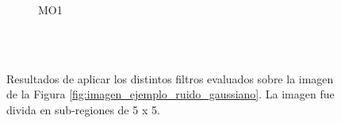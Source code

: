\begin{figure}
{\begin{subfigure}[b]{0.25\textwidth}
			\caption{MO1}
			\label{fig:mo1}
		\end{subfigure}
	}\\
	\\
	\caption{Resultados de aplicar los distintos filtros evaluados sobre la imagen de la Figura \ref{fig:imagen_ejemplo_ruido_gaussiano}. La imagen fue divida en sub-regiones de 5 x 5.}	
	\label{fig:imagenes_resultado}
\end{figure}

